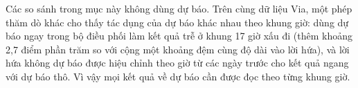 Các so sánh trong mục này không dùng dự báo. Trên cùng dữ liệu Via, một phép thăm dò khác cho thấy tác dụng của dự báo khác
nhau theo khung giờ: dùng dự báo ngay trong bộ điều phối làm kết quả trễ ở khung 17 giờ xấu đi (thêm khoảng 2,7 điểm phần
trăm so với cộng một khoảng đệm cùng độ dài vào lời hứa), và lời hứa không dự báo được hiệu chỉnh theo giờ từ các ngày trước
cho kết quả ngang với dự báo thô. Vì vậy mọi kết quả về dự báo cần được đọc theo từng khung giờ.

